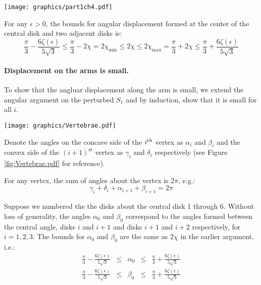 \begin{minipage}{\linewidth}
\begin{center}
\texttt{[image: graphics/part1ch4.pdf]}
\label{fig:part1ch4.pdf}
\end{center}
\end{minipage}

For any $\epsilon > 0$, the bounds for angular displacement formed at the center of the central disk and two adjacent disks is:
$$ \frac{\pi}{3} - \frac{6 \zeta(\epsilon)}{5\sqrt{3}} \leq \frac{\pi}{3} - 2 \chi = 2\chi_\text{min} \leq 2\chi \leq 2\chi_\text{max} = \frac{\pi}{3} + 2 \chi \leq \frac{\pi}{3} + \frac{6 \zeta(\epsilon)}{5\sqrt{3}}$$
\paragraph{Displacement on the arms is small.}
To show that the angluar displacement along the arm is small, we extend the angular argument on the perturbed $S_1$ and by induction, show that it is small for all $i$.  

\begin{minipage}{\linewidth}
\begin{center}
\texttt{[image: graphics/Vertebrae.pdf]}
\label{fig:Vertebrae.pdf}
\end{center}
\end{minipage}

Denote the angles on the concave side of the $i^\text{th}$ vertex as $\alpha_i$ and $\beta_i$ and the convex side of the $(i+1)^\text{st}$ vertex as $\gamma_i$ and $\delta_i$ respectively (see Figure \ref{fig:Vertebrae.pdf} for reference). 

For any vertex, the sum of angles about the vertex is $2 \pi$, e.g.:
$$\gamma_i + \delta_i + \alpha_{i+1} + \beta_{i+1} = 2 \pi$$ 

Suppose we numbered the the disks about the central disk 1 through 6.  
Without loss of generality, the angles $\alpha_0$ and $\beta_0$ correspond to the angles formed between the central angle, disks $i$ and $i+1$ and disks $i+1$ and $i+2$ respectively, for $i = 1,2,3$.  
The bounds for $\alpha_0$ and $\beta_0$ are the same as $2\chi$ in the earlier argument, i.e.:
$$
\begin{array}{rcccl}
\frac{\pi}{3} - \frac{6 \zeta(\epsilon)}{5\sqrt{3}} &\leq& \alpha_0 &\leq& \frac{\pi}{3} + \frac{6 \zeta(\epsilon)}{5\sqrt{3}}\\
\frac{\pi}{3} - \frac{6 \zeta(\epsilon)}{5\sqrt{3}} &\leq& \beta_0 &\leq& \frac{\pi}{3} + \frac{6 \zeta(\epsilon)}{5\sqrt{3}}\\
\end{array}
$$

